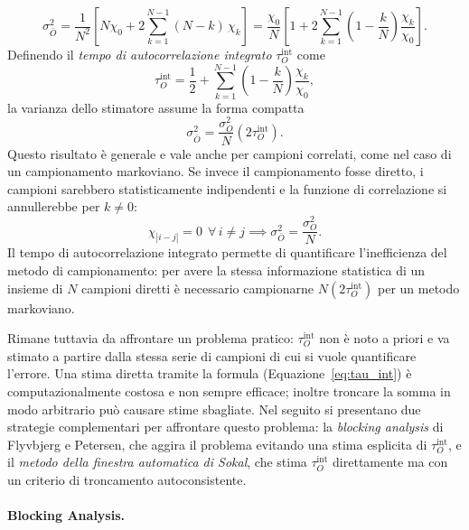 \begin{equation}
    \sigma^2_{\bar{O}} = \frac{1}{N^2} \left[ N \chi_0 + 2\sum_{k=1}^{N-1} (N-k)\,\chi_k \right] = \frac{\chi_0}{N}\left[ 1 + 2\sum_{k=1}^{N-1}\left(1-\frac{k}{N}\right)\frac{\chi_k}{\chi_0} \right].
\end{equation} Definendo il \emph{tempo di autocorrelazione integrato} $\tau^{\mathrm{int}}_O$ come
\begin{equation}
    \label{eq:tau_int}
    \tau^{\mathrm{int}}_O = \frac{1}{2} + \sum_{k=1}^{N-1}\left(1-\frac{k}{N}\right)\frac{\chi_k}{\chi_0},
\end{equation} la varianza dello stimatore assume la forma compatta
\begin{equation}
    \label{eq:var_tau}
    \sigma^2_{\bar{O}} = \frac{\sigma^2_O}{N} \left( 2\tau^{\mathrm{int}}_O \right).
\end{equation} Questo risultato è generale e vale anche per campioni correlati, come nel caso di un campionamento markoviano. Se invece il campionamento fosse diretto, i campioni sarebbero statisticamente indipendenti e la funzione di correlazione si annullerebbe per $k \neq 0$:
\begin{equation}
    \chi_{|i-j|} = 0 \ \ \forall\, i\neq j \implies \sigma^2_{\bar{O}} = \frac{\sigma^2_{O}}{N}.
\end{equation} Il tempo di autocorrelazione integrato permette di quantificare l'inefficienza del metodo di campionamento: per avere la stessa informazione statistica di un insieme di $N$ campioni diretti è necessario campionarne $N(2\tau^{\mathrm{int}}_O)$ per un metodo markoviano.

Rimane tuttavia da affrontare un problema pratico: $\tau^{\mathrm{int}}_O$ non è noto a priori e va stimato a partire dalla stessa serie di campioni di cui si vuole quantificare l'errore. Una stima diretta tramite la formula (Equazione~\ref{eq:tau_int}) è computazionalmente costosa e non sempre efficace; inoltre troncare la somma in modo arbitrario può causare stime sbagliate. Nel seguito si presentano due strategie complementari per affrontare questo problema: la \emph{blocking analysis} di Flyvbjerg e Petersen, che aggira il problema evitando una stima esplicita di $\tau^{\mathrm{int}}_O$, e il \emph{metodo della finestra automatica di Sokal}, che stima $\tau^{\mathrm{int}}_O$ direttamente ma con un criterio di troncamento autoconsistente.

\paragraph*{Blocking Analysis.}

